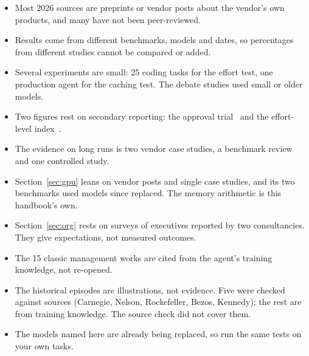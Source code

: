 \documentclass[11pt,letterpaper]{article}
\begin{document}
{\small
\begin{itemize}
  \item Most 2026 sources are preprints or vendor posts about the vendor's own products, and
        many have not been peer-reviewed.
  \item Results come from different benchmarks, models and dates, so percentages from
        different studies cannot be compared or added.
  \item Several experiments are small: 25 coding tasks for the effort test, one production
        agent for the caching test. The debate studies used small or older models.
  \item Two figures rest on secondary reporting: the approval trial~\cite{newstack} and the
        effort-level index~\cite{datanorth}.
  \item The evidence on long runs is two vendor case studies, a benchmark review and one
        controlled study.
  \item Section~\ref{sec:gpu} leans on vendor posts and single case studies, and its two
        benchmarks used models since replaced. The memory arithmetic is this handbook's own.
  \item Section~\ref{sec:org} rests on surveys of executives reported by two
        consultancies. They give expectations, not measured outcomes.
  \item The 15 classic management works are cited from the agent's training knowledge, not
        re-opened.
  \item The historical episodes are illustrations, not evidence. Five were checked against
        sources (Carnegie, Nelson, Rockefeller, Bezos, Kennedy); the rest are from training
        knowledge. The source check did not cover them.
  \item The models named here are already being replaced, so run the same tests on your own
        tasks.
\end{itemize}}
\end{document}
